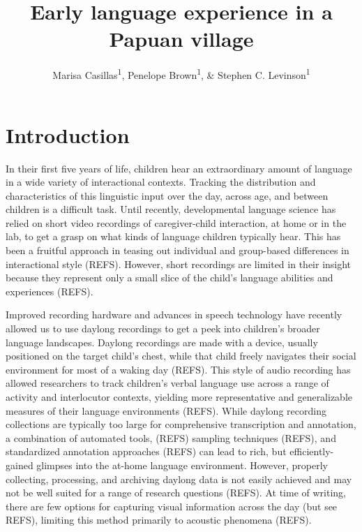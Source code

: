 \documentclass[,man,floatsintext]{apa6}
\title{Early language experience in a Papuan village}
\author{Marisa Casillas\textsuperscript{1}, Penelope Brown\textsuperscript{1},
\& Stephen C. Levinson\textsuperscript{1}}
\date{}
\affiliation{
\vspace{0.5cm}
\textsuperscript{1} Max Planck Institute for Psycholinguistics}
\begin{document}
\maketitle

\section{Introduction}\label{intro}

In their first five years of life, children hear an extraordinary amount
of language in a wide variety of interactional contexts. Tracking the
distribution and characteristics of this linguistic input over the day,
across age, and between children is a difficult task. Until recently,
developmental language science has relied on short video recordings of
caregiver-child interaction, at home or in the lab, to get a grasp on
what kinds of language children typically hear. This has been a fruitful
approach in teasing out individual and group-based differences in
interactional style (REFS). However, short recordings are limited in
their insight because they represent only a small slice of the child's
language abilities and experiences (REFS).

Improved recording hardware and advances in speech technology have
recently allowed us to use daylong recordings to get a peek into
children's broader language landscapes. Daylong recordings are made with
a device, usually positioned on the target child's chest, while that
child freely navigates their social environment for most of a waking day
(REFS). This style of audio recording has allowed researchers to track
children's verbal language use across a range of activity and
interlocutor contexts, yielding more representative and generalizable
measures of their language environments (REFS). While daylong recording
collections are typically too large for comprehensive transcription and
annotation, a combination of automated tools, (REFS) sampling techniques
(REFS), and standardized annotation approaches (REFS) can lead to rich,
but efficiently-gained glimpses into the at-home language environment.
However, properly collecting, processing, and archiving daylong data is
not easily achieved and may not be well suited for a range of research
questions (REFS). At time of writing, there are few options for
capturing visual information across the day (but see REFS), limiting
this method primarily to acoustic phenomena (REFS).
\end{document}
